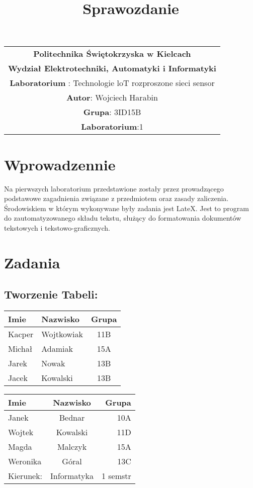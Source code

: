 \documentclass[12pt]{report}
\title{\Huge\textbf{Sprawozdanie}}
\begin{document}
\maketitle
\begin{center}
\begin{tabular}{|c|}
\hline 
\textbf{Politechnika Świętokrzyska w Kielcach}  \\
\textbf{Wydział Elektrotechniki, Automatyki i Informatyki} \\
\hline 
\textbf{Laboratorium} : Technologie loT rozproszone sieci sensor \\
\hline
\textbf{Autor}: Wojciech Harabin\\
\textbf{Grupa}: 3ID15B\\
\hline
\textbf{Laboratorium}:1\\
\hline
\end{tabular}
\end{center}
\section*{Wprowadzennie}\label{wprowadzenie}
Na pierwszych laboratorium przedstawione zostały przez prowadzącego
podstawowe zagadnienia związane z przedmiotem oraz zasady zaliczenia. Środowiskiem 
w którym wykonywane były zadania jest LateX. 
Jest to program do zautomatyzowanego składu tekstu, służący do formatowania 
dokumentów tekstowych i tekstowo-graficznych. 
\section*{Zadania}\label{zadania}
\subsection*{Tworzenie Tabeli:}
\begin{tabular}{|l|l|c|}
\hline \hline
Imie & Nazwisko & Grupa \\
\hline
Kacper & Wojtkowiak & 11B \\
\hline
Michał & Adamiak & 15A \\
\hline
Jarek & Nowak & 13B \\
\hline
Jacek & Kowalski & 13B \\
\hline \hline
\end{tabular}
\begin{tabular}{|lc|r|}
\hline
Imie  & Nazwisko & Grupa\\
\hline
Janek & Bednar &  10A\\
Wojtek & Kowalski & 11D\\
Magda & Malczyk & 15A\\
Weronika & Góral & 13C\\
\hline
\hline
Kierunek:&
Informatyka &
1 semstr\\
\hline
\end{tabular}
\newpage
\end{document}
